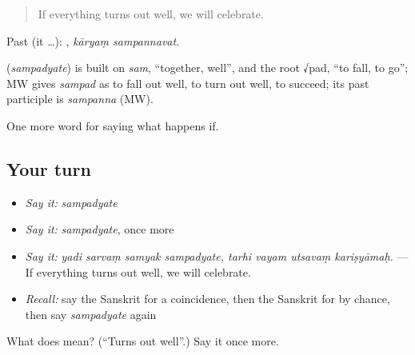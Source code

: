 \begin{quote}
If everything turns out well, we will celebrate.
\end{quote}

Past (it …):  , \emph{kāryaṃ sampannavat}.

\begin{cousinweb}
\textbf{} (\emph{sampadyate}) is built on \emph{sam}, \textquotedblleft{}together, well\textquotedblright{}, and the root √pad, \textquotedblleft{}to fall, to go\textquotedblright{}; MW gives \emph{sampad} as to fall out well, to turn out well, to succeed; its past participle is \emph{sampanna} (MW).
\end{cousinweb}

\begin{grammarlens}[title={What you've built}]
One more word for saying what happens if.
\end{grammarlens}

\subsection*{Your turn}
\begin{itemize}
\raggedright
  \item \emph{Say it:} \emph{sampadyate}
  \item \emph{Say it:} \emph{sampadyate}, once more
  \item \emph{Say it:} \emph{yadi sarvaṃ samyak sampadyate, tarhi vayam utsavaṃ kariṣyāmaḥ.} — If everything turns out well, we will celebrate.
  \item \emph{Recall:} say the Sanskrit for a coincidence, then the Sanskrit for by chance, then say \emph{sampadyate} again
\end{itemize}

\begin{tcolorbox}[breakable,colback=teal!4,colframe=teal!35!black,title={Before you move on}]
What does  mean? (\textquotedblleft{}Turns out well\textquotedblright{}.) Say it once more.
\end{tcolorbox}
